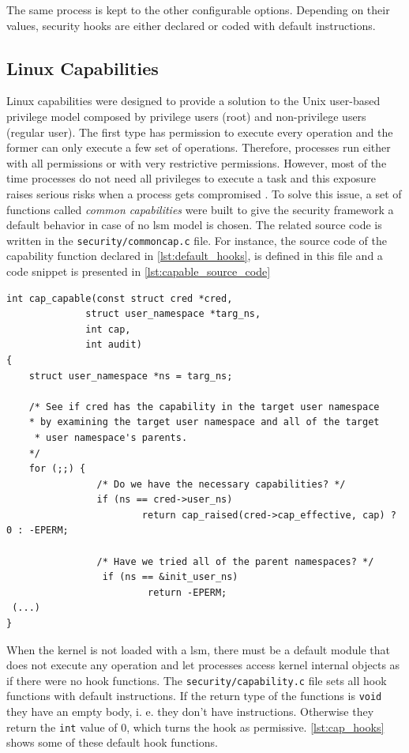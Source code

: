 The same process is kept to the other configurable options. Depending on their values, security hooks are either declared or coded with default instructions.

\subsection{Linux Capabilities}
\label{sec:linux_capabilities}

Linux capabilities were designed to provide a solution to the Unix user-based privilege model composed by privilege users (root) and non-privilege users (regular user). The first type has permission to execute every operation and the former can only execute a few set of operations. Therefore, processes run either with all permissions or with very restrictive permissions. However, most of the time processes do not need all privileges to execute a task and this exposure raises serious risks when a process gets compromised \cite{Wiki:Capabilities}. To solve this issue, a set of functions called \textit{common capabilities} were built to give the security framework a default behavior in case of no \gls{lsm} model is chosen. The related source code is written in the \texttt{security/commoncap.c} file. For instance, the source code of the capability function declared in \autoref{lst:default_hooks}, is defined in this file and a code snippet is presented in \autoref{lst:capable_source_code}

\begin{lstlisting}[caption=Code snippet of the \texttt{cap\_capable()} function (Linux kernel v3.11), label=lst:capable_source_code]
int cap_capable(const struct cred *cred, 
			  struct user_namespace *targ_ns,
			  int cap, 
			  int audit)
{
	struct user_namespace *ns = targ_ns;
	
	/* See if cred has the capability in the target user namespace
	* by examining the target user namespace and all of the target
	 * user namespace's parents.
	*/
	for (;;) {
                /* Do we have the necessary capabilities? */
                if (ns == cred->user_ns)
                        return cap_raised(cred->cap_effective, cap) ? 0 : -EPERM;

                /* Have we tried all of the parent namespaces? */
                 if (ns == &init_user_ns)
                         return -EPERM;
 (...)
}
\end{lstlisting}

When the kernel is not loaded with a \gls{lsm}, there must be a default module that does not execute any operation and let processes access kernel internal objects as if there were no hook functions. The \texttt{security/capability.c} file sets all hook functions with default instructions. If the return type of the functions is \texttt{void} they have an empty body, i. e. they don't have instructions. Otherwise they return the \texttt{int} value of 0, which turns the hook as permissive. \autoref{lst:cap_hooks} shows some of these default hook functions.

